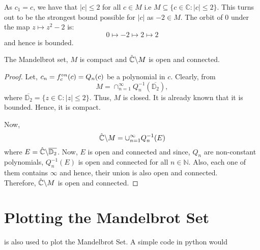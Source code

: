As \( c_1=c \), we have that \( |c|\le 2 \) for all \( c\in M \) i.e \( M \subseteq \{c\in \mathbb{C}:|c|\le 2\} \). 
This turns out to be the strongest bound possible for \( |c| \)
as \( -2\in M \). The orbit of \( 0 \) under the map \( z\mapsto z^2-2 \) is: \[ 0\mapsto -2\mapsto 2\mapsto 2 \]
and hence is bounded.

\begin{theorem}
	The Mandelbrot set, \( M \) is compact and \( \hat{\mathbb{C}}\backslash M \) is open and connected.
\end{theorem}
\begin{proof}
	Let, \( c_n=\fcof[n](c)=Q_n(c) \) be a polynomial in \( c \). Clearly, from  \[
		M=\cap_{n=1}^{\infty}Q_n^{-1}(\overline{\mathbb{D}_2}),
	\] where \( \overline{\mathbb{D}_2}=\{z\in \mathbb{C}:|z|\le 2\} \).
	Thus, \( M \) is closed. It is already known that it is bounded. Hence, it is compact.

	Now, \[
		\hat{\mathbb{C}}\backslash M=\cup_{n=1}^\infty Q_n^{-1}(E)
	\] where \( E=\hat{\mathbb{C}}\backslash\overline{\mathbb{D}_2}\). Now, \( E \) is open and connected and 
	since, \( Q_n \) are non-constant polynomials, \( Q_n^{-1}(E) \) is open and connected for all \( n\in \mathbb{N} \).
	Also, each one of them contains \( \infty \) and hence, their union is also open and connected.\\
	Therefore, \( \hat{\mathbb{C}}\backslash M \) is open and connected.

\end{proof}

\section{Plotting the Mandelbrot Set}
 is also used to plot the Mandelbrot Set. A simple code in python would
